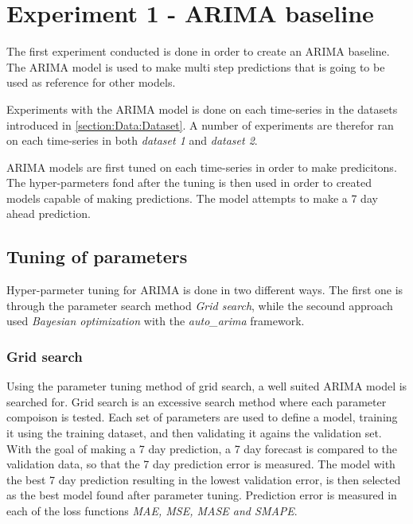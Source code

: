 
\section{Experiment 1 - ARIMA baseline}
\label{section:Method:Experiment1}
The first experiment conducted is done in order to create an ARIMA baseline.
The ARIMA model is used to make multi step predictions that is going to be used as reference for other models.

Experiments with the ARIMA model is done on each time-series in the datasets introduced in \cref{section:Data:Dataset}.
A number of experiments are therefor ran on each time-series in both \textit{dataset 1} and \textit{dataset 2}.

ARIMA models are first tuned on each time-series in order to make predicitons.
The hyper-parmeters fond after the tuning is then used in order to created models capable of making predictions.
The model attempts to make a 7 day ahead prediction.


\subsection{Tuning of parameters}
Hyper-parmeter tuning for ARIMA is done in two different ways.
The first one is through the parameter search method \textit{Grid search},
while the secound approach used \textit{Bayesian optimization} with the \textit{auto\_arima} framework.

\subsubsection*{Grid search}
Using the parameter tuning method of grid search, a well suited ARIMA model is searched for.
Grid search is an excessive search method where each parameter compoison is tested.
Each set of parameters are  used to define a model, training it using the training dataset,
and then validating it agains the validation set.
With the goal of making a 7 day prediction, a 7 day forecast is compared to the validation data,
so that the 7 day prediction error is measured.
The model with the best 7 day prediction resulting in the lowest validation error,
is then selected as the best model found after parameter tuning.
Prediction error is measured in each of the loss functions \textit{MAE, MSE, MASE and SMAPE}.

